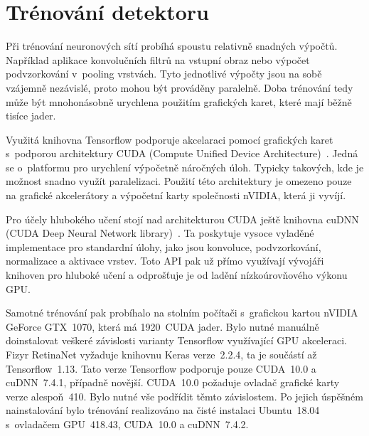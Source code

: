 
\chapter{Trénování detektoru}
\label{chap_4}

Při trénování neuronových sítí probíhá spoustu relativně snadných výpočtů. Například aplikace konvolučních filtrů na vstupní obraz nebo výpočet podvzorkování v~pooling vrstvách. Tyto jednotlivé výpočty jsou na sobě vzájemně nezávislé, proto mohou být prováděny paralelně. Doba trénování tedy může být mnohonásobně urychlena použitím grafických karet, které mají běžně tisíce jader.

Využitá knihovna Tensorflow podporuje akcelaraci pomocí grafických karet s~podporou architektury CUDA (Compute Unified Device Architecture)~\cite{docsCuda}. Jedná se o~platformu pro urychlení výpočetně náročných úloh. Typicky takových, kde je možnost snadno využít paralelizaci. Použití této architektury je omezeno pouze na grafické akcelerátory a výpočetní karty společnosti nVIDIA, která ji vyvíjí.

Pro účely hlubokého učení stojí nad architekturou CUDA ještě knihovna cuDNN (CUDA Deep Neural Network library)~\cite{docsCuda}. Ta poskytuje vysoce vyladěné implementace pro standardní úlohy, jako jsou konvoluce, podvzorkování, normalizace a aktivace vrstev. Toto API pak už přímo využívají vývojáři knihoven pro hluboké učení a odprošťuje je od ladění nízkoúrovňového výkonu GPU.

Samotné trénování pak probíhalo na stolním počítači s~grafickou kartou nVIDIA GeForce GTX~1070, která má 1920~CUDA jader. Bylo nutné manuálně doinstalovat veškeré závislosti varianty Tensorflow využívající GPU akceleraci. Fizyr RetinaNet vyžaduje knihovnu Keras verze~2.2.4, ta je součástí až Tensorflow~1.13. Tato verze Tensorflow podporuje pouze CUDA~10.0 a cuDNN~7.4.1, případně novější. CUDA~10.0 požaduje ovladač grafické karty verze alespoň~410. Bylo nutné vše podřídit těmto závislostem. Po jejich úspěšném nainstalování bylo trénování realizováno na čisté instalaci Ubuntu~18.04 s~ovladačem GPU~418.43, CUDA~10.0 a cuDNN~7.4.2.


